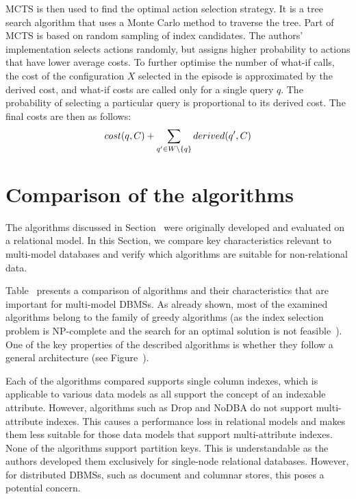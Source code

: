 MCTS is then used to find the optimal action selection strategy. It is a tree search algorithm that uses a Monte Carlo method to traverse the tree. Part of MCTS is based on random sampling of index candidates. The authors' implementation selects actions randomly, but assigns higher probability to actions that have lower average costs. To further optimise the number of what-if calls, the cost of the configuration $X$ selected in the episode is approximated by the derived cost, and what-if costs are called only for a single query $q$. The probability of selecting a particular query is proportional to its derived cost. The final costs are then as follows:
$$
cost(q,C) + \sum_{q' \in W \setminus \{q\}} derived(q',C)
$$



\section{Comparison of the algorithms}

The algorithms discussed in Section~ were originally developed and evaluated on a relational model. In this Section, we compare key characteristics relevant to multi-model databases and verify which algorithms are suitable for non-relational data.

Table~ presents a comparison of algorithms and their characteristics that are important for multi-model DBMSs. As already shown, most of the examined algorithms belong to the family of greedy algorithms (as the index selection problem is NP-complete and the search for an optimal solution is not feasible~\citep{NP-complete}). One of the key properties of the described algorithms is whether they follow a general architecture (see Figure~).

Each of the algorithms compared supports single column indexes, which is applicable to various data models as all support the concept of an indexable attribute. However, algorithms such as Drop and NoDBA do not support multi-attribute indexes. This causes a performance loss in relational models and makes them less suitable for those data models that support multi-attribute indexes. None of the algorithms support partition keys. This is understandable as the authors developed them exclusively for single-node relational databases. However, for distributed DBMSs, such as document and columnar stores, this poses a potential concern.

